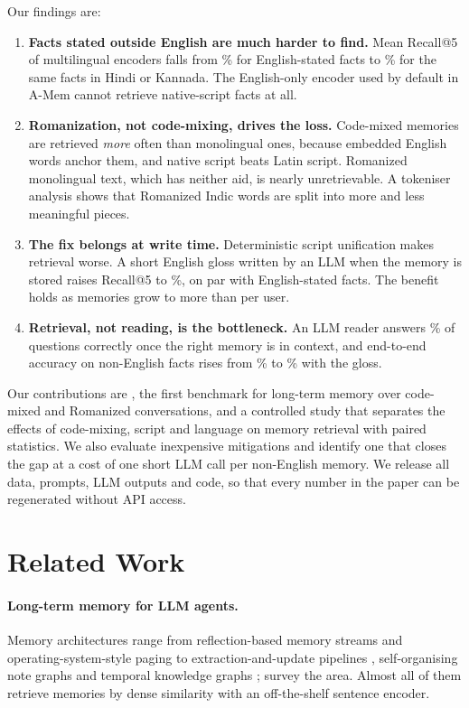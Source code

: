 Our findings are:
\begin{enumerate}
\item \textbf{Facts stated outside English are much harder to find.} Mean Recall@5 of multilingual encoders falls from \EnAvgRaw\% for English-stated facts to \MitAvgRaw\% for the same facts in Hindi or Kannada. The English-only encoder used by default in A-Mem cannot retrieve native-script facts at all.
\item \textbf{Romanization, not code-mixing, drives the loss.} Code-mixed memories are retrieved \emph{more} often than monolingual ones, because embedded English words anchor them, and native script beats Latin script. Romanized monolingual text, which has neither aid, is nearly unretrievable. A tokeniser analysis shows that Romanized Indic words are split into more and less meaningful pieces.
\item \textbf{The fix belongs at write time.} Deterministic script unification makes retrieval worse. A short English gloss written by an LLM when the memory is stored raises Recall@5 to \MitAvgGloss\%, on par with English-stated facts. The benefit holds as memories grow to more than \PoolNLarge{} per user.
\item \textbf{Retrieval, not reading, is the bottleneck.} An LLM reader answers \EtoEOracleNonEn\% of questions correctly once the right memory is in context, and end-to-end accuracy on non-English facts rises from \EtoERawNonEn\% to \EtoEGlossNonEn\% with the gloss.
\end{enumerate}

Our contributions are \lipi{}, the first benchmark for long-term memory over code-mixed and Romanized conversations, and a controlled study that separates the effects of code-mixing, script and language on memory retrieval with paired statistics. We also evaluate inexpensive mitigations and identify one that closes the gap at a cost of one short LLM call per non-English memory. We release all data, prompts, LLM outputs and code, so that every number in the paper can be regenerated without API access.

\section{Related Work}
\label{sec:related}

\paragraph{Long-term memory for LLM agents.}
Memory architectures range from reflection-based memory streams \citep{park2023generative} and operating-system-style paging \citep{packer2023memgpt} to extraction-and-update pipelines \citep{chhikara2025mem0}, self-organising note graphs \citep{xu2025amem} and temporal knowledge graphs \citep{rasmussen2025zep}; \citet{zhang2024memorysurvey} survey the area. Almost all of them retrieve memories by dense similarity with an off-the-shelf sentence encoder.

